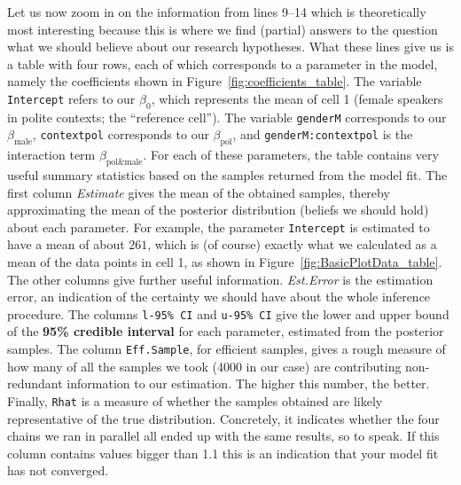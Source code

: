\documentclass[nobib]{tufte-handout}
\begin{document}
Let us now zoom in on the information from lines 9--14 which is theoretically most interesting because this is where we find (partial) answers to the question what we should believe about our research hypotheses. What these lines give us is a table with four rows, each of which corresponds to a parameter in the model, namely the coefficients shown in Figure~\ref{fig:coefficients_table}. The variable \texttt{Intercept} refers to our $\beta_0$, which represents the mean of cell 1 (female speakers in polite contexts; the ``reference cell''). The variable \texttt{genderM} corresponds to our $\beta_{\text{male}}$, \texttt{contextpol} corresponds to our $\beta_{\text{pol}}$, and \texttt{genderM:contextpol} is the interaction term $\beta_{\text{pol\&male}}$. For each of these parameters, the table contains very useful summary statistics based on the samples returned from the model fit. The first column \emph{Estimate} gives the mean of the obtained samples, thereby approximating the mean of the posterior distribution (beliefs we should hold) about each parameter. For example, the parameter \texttt{Intercept} is estimated to have a mean of about $261$, which is (of course) exactly what we calculated as a mean of the data points in cell 1, as shown in Figure~\ref{fig:BasicPlotData_table}. The other columns give further useful information. \emph{Est.Error} is the estimation error, an indication of the certainty we should have about the whole inference procedure. The columns \texttt{l-95\% CI} and \texttt{u-95\% CI} give the lower and upper bound of the \textbf{95\% credible interval} for each parameter, estimated from the posterior samples.
%
%
The column \texttt{Eff.Sample}, for efficient samples, gives a rough measure of how many of all the samples we took (4000 in our case) are contributing non-redundant information to our estimation. The higher this number, the better. Finally, \texttt{Rhat} is a measure of whether the samples obtained are likely representative of the true distribution. Concretely, it indicates whether the four chains we ran in parallel all ended up with the same results, so to speak. If this column contains values bigger than 1.1 this is an indication that your model fit has not converged.
\end{document}
